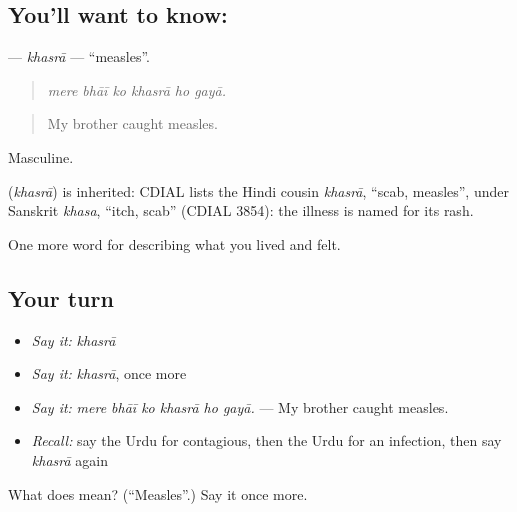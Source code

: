 \subsection*{You'll want to know: }
\textbf{} — \emph{khasrā} — \textquotedblleft{}measles\textquotedblright{}.

\begin{quote}
     
\end{quote}

\begin{quote}
\emph{mere bhāī ko khasrā ho gayā.}
\end{quote}

\begin{quote}
My brother caught measles.
\end{quote}

Masculine.

\begin{cousinweb}
\textbf{} (\emph{khasrā}) is inherited: CDIAL lists the Hindi cousin \emph{khasrā}, \textquotedblleft{}scab, measles\textquotedblright{}, under Sanskrit \emph{khasa}, \textquotedblleft{}itch, scab\textquotedblright{} (CDIAL 3854): the illness is named for its rash.
\end{cousinweb}

\begin{grammarlens}[title={What you've built}]
One more word for describing what you lived and felt.
\end{grammarlens}

\subsection*{Your turn}
\begin{itemize}
\raggedright
  \item \emph{Say it:} \emph{khasrā}
  \item \emph{Say it:} \emph{khasrā}, once more
  \item \emph{Say it:} \emph{mere bhāī ko khasrā ho gayā.} — My brother caught measles.
  \item \emph{Recall:} say the Urdu for contagious, then the Urdu for an infection, then say \emph{khasrā} again
\end{itemize}

\begin{tcolorbox}[breakable,colback=teal!4,colframe=teal!35!black,title={Before you move on}]
What does  mean? (\textquotedblleft{}Measles\textquotedblright{}.) Say it once more.
\end{tcolorbox}
